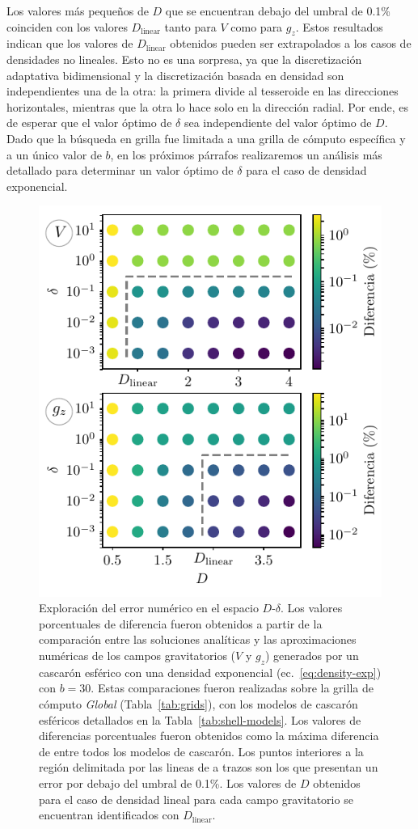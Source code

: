 Los valores más pequeños de $D$ que se encuentran debajo del umbral de 0.1\%
coinciden con los valores $D_\text{linear}$ tanto para $V$ como para $g_z$.
Estos resultados indican que los valores de $D_\text{linear}$ obtenidos pueden
ser extrapolados a los casos de densidades no lineales.
Esto no es una sorpresa, ya que la discretización adaptativa bidimensional y la
discretización basada en densidad son independientes una de la otra: la primera
divide al tesseroide en las direcciones horizontales, mientras que la otra lo
hace solo en la dirección radial.
Por ende, es de esperar que el valor óptimo de $\delta$ sea independiente del
valor óptimo de $D$.
Dado que la búsqueda en grilla fue limitada a una grilla de cómputo específica
y a un único valor de $b$, en los próximos párrafos realizaremos un análisis
más detallado para determinar un valor óptimo de $\delta$ para el caso de
densidad exponencial.

\begin{figure}
\centering
\includegraphics[width=0.5\linewidth]{figs/tesseroids-variable-density/grid-search.pdf}
\caption{
    Exploración del error numérico en el espacio $D$-$\delta$.
    Los valores porcentuales de diferencia fueron obtenidos a partir de la
    comparación entre las soluciones analíticas y las aproximaciones numéricas
    de los campos gravitatorios ($V$ y $g_z$) generados por un cascarón
    esférico con una densidad exponencial
    (ec.~\ref{eq:density-exp}) con $b=30$.
    Estas comparaciones fueron realizadas sobre la grilla de cómputo
    \emph{Global} (Tabla~\ref{tab:grids}), con los modelos de cascarón
    esféricos detallados en la Tabla~\ref{tab:shell-models}.
    Los valores de diferencias porcentuales fueron obtenidos como la máxima
    diferencia de entre todos los modelos de cascarón.
    Los puntos interiores a la región delimitada por las lineas de a trazos son
    los que presentan un error por debajo del umbral de 0.1\%.
    Los valores de $D$ obtenidos para el caso de densidad lineal para cada
    campo gravitatorio se encuentran identificados con $D_\text{linear}$.
    }
\label{fig:grid-search}
\end{figure}


